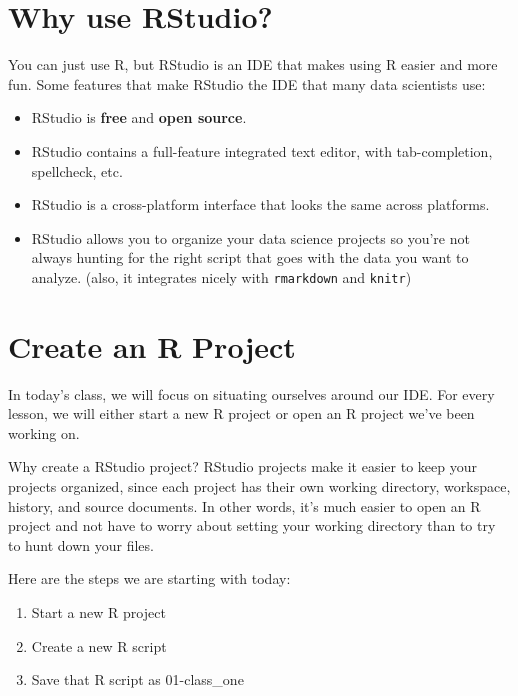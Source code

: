 \documentclass[
]{book}
\begin{document}
\hypertarget{why-use-rstudio}{%
\section{Why use RStudio?}\label{why-use-rstudio}}

You can just use R, but RStudio is an IDE that makes using R easier and more fun. Some features that make RStudio the IDE that many data scientists use:

\begin{itemize}
\item
  RStudio is \textbf{free} and \textbf{open source}.
\item
  RStudio contains a full-feature integrated text editor, with tab-completion, spellcheck, etc.
\item
  RStudio is a cross-platform interface that looks the same across platforms.
\item
  RStudio allows you to organize your data science projects so you're not always hunting for the right script that goes with the data you want to analyze. (also, it integrates nicely with \texttt{rmarkdown} and \texttt{knitr})
\end{itemize}

\hypertarget{create-an-r-project}{%
\section{Create an R Project}\label{create-an-r-project}}

In today's class, we will focus on situating ourselves around our IDE. For every lesson, we will either start a new R project or open an R project we've been working on.

Why create a RStudio project? RStudio projects make it easier to keep your projects organized, since each project has their own working directory, workspace, history, and source documents. In other words, it's much easier to open an R project and not have to worry about setting your working directory than to try to hunt down your files.

Here are the steps we are starting with today:

\begin{enumerate}
\def\labelenumi{\arabic{enumi}.}
\item
  Start a new R project
\item
  Create a new R script
\item
  Save that R script as 01-class\_one
\end{enumerate}
\end{document}
